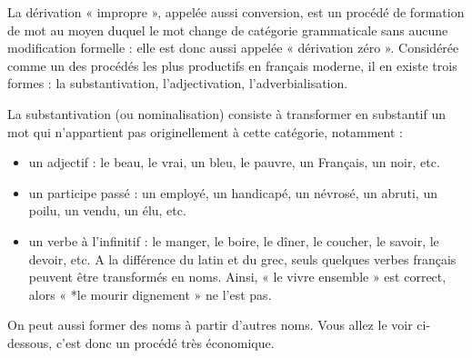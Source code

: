 La dérivation « impropre », appelée aussi conversion, est un procédé de formation de mot au moyen duquel le mot change de catégorie grammaticale sans aucune modification formelle : elle est donc aussi appelée « dérivation zéro ». Considérée comme un des procédés les plus productifs en français moderne, il en existe trois formes : la substantivation, l’adjectivation, l’adverbialisation.

La substantivation (ou nominalisation) consiste à transformer en substantif un mot qui n’appartient pas originellement à cette catégorie, notamment :
\begin{itemize}
\item un adjectif : le beau, le vrai, un bleu, le pauvre, un Français, un noir, etc.
\item un participe passé : un employé, un handicapé, un névrosé, un abruti, un poilu, un vendu, un élu, etc.
\item un verbe à l’infinitif : le manger, le boire, le dîner, le coucher, le savoir, le devoir, etc. A la différence du latin et du grec, seuls quelques verbes français peuvent être transformés en noms. Ainsi, « le vivre ensemble » est correct, alors « *le mourir dignement » ne l’est pas.
\end{itemize}
On peut aussi former des noms à partir d’autres noms. Vous allez le voir ci-dessous, c’est donc un procédé très économique.

